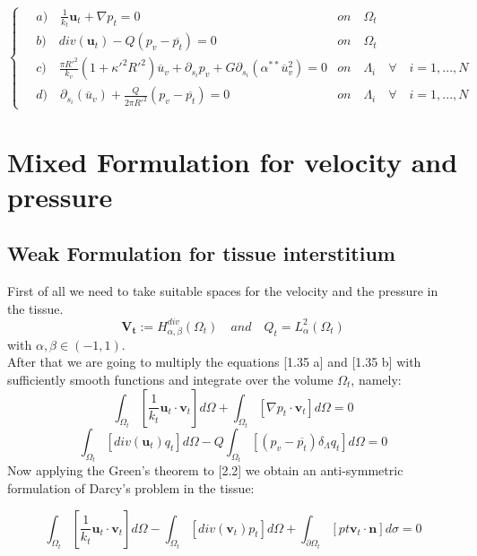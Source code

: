 \documentclass[a4paper]{report}
\begin{document}
\begin{equation}
\begin{cases}
\quad a)\quad \frac{1}{k_t} \mathbf{u}_t+\nabla p_t=0 & on \quad \Omega_t\\
\quad b) \quad div(\mathbf{u}_t)-Q (p_v-\overline{p_t})=0 & on \quad \Omega_t\\
\quad c) \quad \frac{\pi R'^2}{k_v}(1+\kappa'^2 R'^2) \overline{u}_v+ \partial_{s_i} p_v + G \partial_{s_i} (\alpha^{**}\overline{u}_v^2)=0 & on \quad \Lambda_i \quad \forall \quad i=1,...,N\\
\quad d) \quad \partial_{s_i} ( \overline{u}_v) + \frac{Q}{2 \pi R'^2} (p_v - \overline{p_t})=0& on \quad \Lambda_i \quad \forall \quad i=1,...,N
\end{cases}
\end{equation}



\newpage
\chapter{Mixed Formulation for velocity and pressure}
\section{Weak Formulation for tissue interstitium}
First of all we need to take suitable spaces for the velocity and  the pressure in the tissue.
\begin{equation}
\mathbf{V_t}:= H^{div}_{\alpha, \beta}(\Omega_t) \quad and \quad Q_t =L^2_{\alpha}(\Omega_t)
\end{equation}
with $\alpha, \beta \in (-1,1)$.\\
After that we are going to multiply the  equations [1.35 a] and [1.35 b]  with sufficiently smooth functions and integrate over the volume $\Omega_t$, namely:
\begin{equation}
\int_{\Omega_t} [\frac{1}{k_t} \mathbf{u}_t \cdot \mathbf{v}_t] d\Omega+ \int_{\Omega_t} [\nabla p_t \cdot \mathbf{v}_t] d\Omega =0
\end{equation}
\begin{equation}
\int_{\Omega_t} [div(\mathbf{u}_t)q_t ]d\Omega - Q \int_{\Omega_t}[(p_v-\overline{p_t})\delta_{\Lambda}q_t]d\Omega =0
\end{equation}
Now applying the Green's theorem to [2.2]  we obtain an anti-symmetric formulation of Darcy's problem in the tissue:

\begin{equation}
\int_{\Omega_t} [\frac{1}{k_t} \mathbf{u}_t \cdot \mathbf{v}_t] d\Omega- \int_{\Omega_t} [div( \mathbf{v}_t) p_t] d\Omega + \int_{\partial \Omega_t}[pt \mathbf{v}_t \cdot \mathbf{n}]d\sigma =0
\end{equation}
\end{document}
